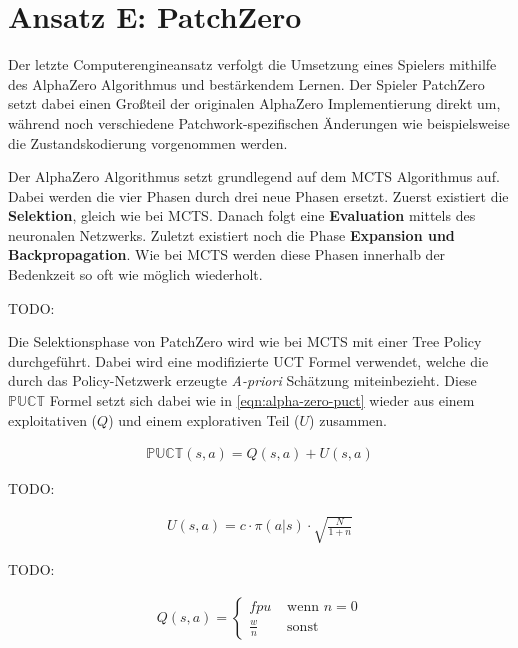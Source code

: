 \pagebreak

\section{Ansatz E: PatchZero}
\label{section:erstellung-ansatz-d}

Der letzte Computerengineansatz verfolgt die Umsetzung eines Spielers mithilfe des AlphaZero Algorithmus und bestärkendem Lernen. Der Spieler PatchZero setzt dabei einen Großteil der originalen AlphaZero Implementierung direkt um, während noch verschiedene Patchwork-spezifischen Änderungen wie beispielsweise die Zustandskodierung vorgenommen werden.

Der AlphaZero Algorithmus setzt grundlegend auf dem \ac{MCTS} Algorithmus auf. Dabei werden die vier Phasen durch drei neue Phasen ersetzt. Zuerst existiert die \textbf{Selektion}, gleich wie bei \ac{MCTS}. Danach folgt eine \textbf{Evaluation} mittels des neuronalen Netzwerks. Zuletzt existiert noch die Phase \textbf{Expansion und Backpropagation}. Wie bei \ac{MCTS} werden diese Phasen innerhalb der Bedenkzeit so oft wie möglich wiederholt.

TODO:

Die Selektionsphase von PatchZero wird wie bei \ac{MCTS} mit einer Tree Policy durchgeführt. Dabei wird eine modifizierte \ac{UCT} Formel verwendet, welche die durch das Policy-Netzwerk erzeugte \emph{A-priori} Schätzung miteinbezieht. Diese $\mathbb{PUCT}$ Formel setzt sich dabei wie in \ref{eqn:alpha-zero-puct} wieder aus einem exploitativen ($Q$) und einem explorativen Teil ($U$) zusammen.

\begin{align}
    \label{eqn:alpha-zero-puct}
    \mathbb{PUCT}(s, a) = Q(s,a) + U(s,a)
\end{align}

TODO:

\begin{align}
    \label{eqn:alpha-zero-puct-q}
    U(s,a) = c \cdot \pi(a | s) \cdot \sqrt{\frac{N}{1 + n}}
\end{align}

TODO:

\begin{align}
    \label{eqn:alpha-zero-puct-u}
    Q(s,a) = \begin{cases}
        fpu         & \text{ wenn } n = 0 \\
        \frac{w}{n} & \text{ sonst }
    \end{cases}
\end{align}

